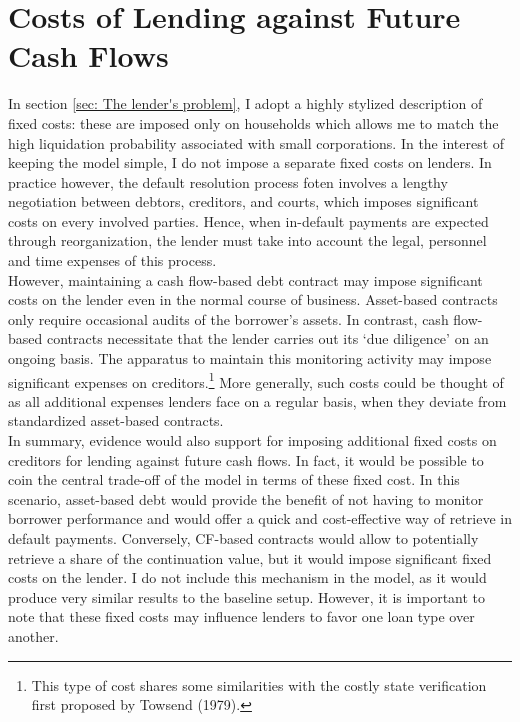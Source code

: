 \documentclass[12pt]{article}
\begin{document}
\section{Costs of Lending against Future Cash Flows \label{sec:fixed costs}}
In section \ref{sec: The lender's problem}, I adopt a highly stylized description of fixed costs: these are imposed only on households which allows me to match the high liquidation probability associated with small corporations. In the interest of keeping the model simple, I do not impose a separate fixed costs on lenders. In practice however, the default resolution process foten involves a lengthy negotiation between debtors, creditors, and courts, which imposes significant costs on every involved parties. Hence, when in-default payments are expected through reorganization, the lender must take into account the legal, personnel and time expenses of this process. \vspace{3mm} \\
However, maintaining a cash flow-based debt contract may impose significant costs on the lender even in the normal course of business. Asset-based contracts only require occasional audits of the borrower's assets. In contrast, cash flow-based contracts necessitate that the lender carries out its `due diligence' on an ongoing basis. The apparatus to maintain this monitoring activity may impose significant expenses on creditors.\footnote{This type of cost shares some similarities with the costly state verification first proposed by Towsend (1979).} More generally, such costs could be thought of as all additional expenses lenders face on a regular basis, when they deviate from standardized asset-based contracts.
\vspace{3mm} \\
In summary, evidence would also support for imposing additional fixed costs on creditors for lending against future cash flows. In fact, it would be possible to coin the central trade-off of the model in terms of these fixed cost. In this scenario, asset-based debt would provide the benefit of not having to monitor borrower performance and would offer a quick and cost-effective way of retrieve in default payments. Conversely, CF-based contracts would allow to potentially retrieve a share of the continuation value, but it would impose significant fixed costs on the lender. I do not include this mechanism in the model, as it would produce very similar results to the baseline setup. However, it is important to note that these fixed costs may influence lenders to favor one loan type over another.
\end{document}
